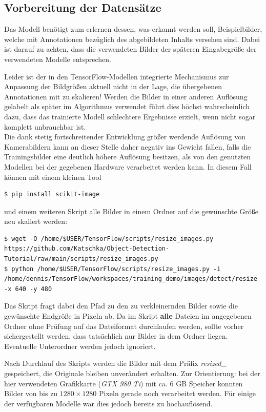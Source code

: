 \documentclass[12pt, oneside]{article}
\begin{document}
\subsection{Vorbereitung der Datensätze}

Das Modell benötigt zum erlernen dessen, was erkannt werden soll, Beispielbilder, welche mit Annotationen bezüglich des abgebildeten Inhalts versehen sind. Dabei ist darauf zu achten, dass die verwendeten Bilder der späteren Eingabegröße der verwendeten Modelle entsprechen.

Leider ist der in den TensorFlow-Modellen integrierte Mechanismus zur Anpassung der Bildgrößen aktuell nicht in der Lage, die übergebenen Annotationen mit zu skalieren! Werden die Bilder in einer anderen Auflösung gelabelt als später im Algorithmus verwendet führt dies höchst wahrscheinlich dazu, dass das trainierte Modell schlechtere Ergebnisse erzielt, wenn nicht sogar komplett unbrauchbar ist.\\

Die dank stetig fortschreitender Entwicklung größer werdende Auflösung von Kamerabildern kann an dieser Stelle daher negativ ins Gewicht fallen, falls die Trainingsbilder eine deutlich höhere Auflösung besitzen, als von den genutzten Modellen bei der gegebenen Hardware verarbeitet werden kann. In diesem Fall können mit einem kleinen Tool

\begin{verbatim}    
$ pip install scikit-image
\end{verbatim}
und einem weiteren Skript alle Bilder in einem Ordner auf die gewünschte Größe neu skaliert werden:

\begin{verbatim}    
$ wget -O /home/$USER/TensorFlow/scripts/resize_images.py https://github.com/Katschka/Object-Detection-Tutorial/raw/main/scripts/resize_images.py
$ python /home/$USER/TensorFlow/scripts/resize_images.py -i /home/dennis/TensorFlow/workspaces/training_demo/images/detect/resize -x 640 -y 480
\end{verbatim}
Das Skript fragt dabei den Pfad zu den zu verkleinernden Bilder sowie die gewünschte Endgröße in Pixeln ab. Da im Skript \textbf{alle} Dateien im angegebenen Ordner ohne Prüfung auf das Dateiformat durchlaufen werden, sollte vorher sichergestellt werden, dass tatsächlich nur Bilder in dem Ordner liegen. Eventuelle Unterordner werden jedoch ignoriert.

Nach Durchlauf des Skripts werden die Bilder mit dem Präfix \textit{resized\_} gespeichert, die Originale bleiben unverändert erhalten. Zur Orientierung: bei der hier verwendeten Grafikkarte (\textit{GTX 980 Ti}) mit ca. 6 GB Speicher konnten Bilder von bis zu $1280\times1280$ Pixeln gerade noch verarbeitet werden. Für einige der verfügbaren Modelle war dies jedoch bereits zu hochauflösend.\\
\end{document}
